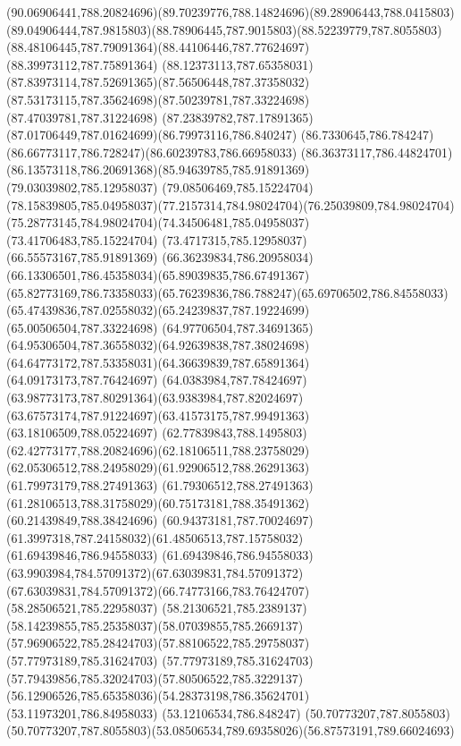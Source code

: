 {{\curveto(90.06906441,788.20824696)(89.70239776,788.14824696)(89.28906443,788.0415803)
\curveto(89.04906444,787.9815803)(88.78906445,787.9015803)(88.52239779,787.8055803)
\curveto(88.48106445,787.79091364)(88.44106446,787.77624697)(88.39973112,787.75891364)
\curveto(88.12373113,787.65358031)(87.83973114,787.52691365)(87.56506448,787.37358032)
\curveto(87.53173115,787.35624698)(87.50239781,787.33224698)(87.47039781,787.31224698)
\curveto(87.23839782,787.17891365)(87.01706449,787.01624699)(86.79973116,786.840247)
\curveto(86.7330645,786.784247)(86.66773117,786.728247)(86.60239783,786.66958033)
\curveto(86.36373117,786.44824701)(86.13573118,786.20691368)(85.94639785,785.91891369)
\lineto(79.03039802,785.12958037)
\lineto(79.08506469,785.15224704)
\curveto(78.15839805,785.04958037)(77.2157314,784.98024704)(76.25039809,784.98024704)
\curveto(75.28773145,784.98024704)(74.34506481,785.04958037)(73.41706483,785.15224704)
\lineto(73.4717315,785.12958037)
\lineto(66.55573167,785.91891369)
\curveto(66.36239834,786.20958034)(66.13306501,786.45358034)(65.89039835,786.67491367)
\curveto(65.82773169,786.73358033)(65.76239836,786.788247)(65.69706502,786.84558033)
\curveto(65.47439836,787.02558032)(65.24239837,787.19224699)(65.00506504,787.33224698)
\curveto(64.97706504,787.34691365)(64.95306504,787.36558032)(64.92639838,787.38024698)
\curveto(64.64773172,787.53358031)(64.36639839,787.65891364)(64.09173173,787.76424697)
\curveto(64.0383984,787.78424697)(63.98773173,787.80291364)(63.9383984,787.82024697)
\curveto(63.67573174,787.91224697)(63.41573175,787.99491363)(63.18106509,788.05224697)
\curveto(62.77839843,788.1495803)(62.42773177,788.20824696)(62.18106511,788.23758029)
\curveto(62.05306512,788.24958029)(61.92906512,788.26291363)(61.79973179,788.27491363)
\lineto(61.79306512,788.27491363)
\curveto(61.28106513,788.31758029)(60.75173181,788.35491362)(60.21439849,788.38424696)
\curveto(60.94373181,787.70024697)(61.3997318,787.24158032)(61.48506513,787.15758032)
\lineto(61.69439846,786.94558033)
\curveto(61.69439846,786.94558033)(63.9903984,784.57091372)(67.63039831,784.57091372)
\curveto(67.63039831,784.57091372)(66.74773166,783.76424707)(58.28506521,785.22958037)
\curveto(58.21306521,785.2389137)(58.14239855,785.25358037)(58.07039855,785.2669137)
\curveto(57.96906522,785.28424703)(57.88106522,785.29758037)(57.77973189,785.31624703)
\curveto(57.77973189,785.31624703)(57.79439856,785.32024703)(57.80506522,785.3229137)
\curveto(56.12906526,785.65358036)(54.28373198,786.35624701)(53.11973201,786.84958033)
\lineto(53.12106534,786.848247)
\lineto(50.70773207,787.8055803)
\curveto(50.70773207,787.8055803)(53.08506534,789.69358026)(56.87573191,789.66024693)
}}
